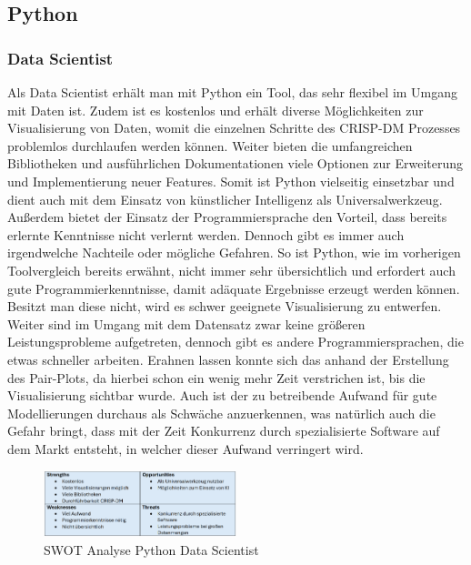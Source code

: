 \documentclass[12pt]{article}
\begin{document}
	\subsection{Python}
	
	\subsubsection{Data Scientist}
	
	Als Data Scientist erhält man mit Python ein Tool, das sehr flexibel im Umgang mit Daten
	ist. Zudem ist es kostenlos und erhält diverse Möglichkeiten zur Visualisierung von
	Daten, womit die einzelnen Schritte des CRISP-DM Prozesses problemlos durchlaufen
	werden können.
	Weiter bieten die umfangreichen Bibliotheken und ausführlichen Dokumentationen
	viele Optionen zur Erweiterung und Implementierung neuer Features. Somit ist Python
	vielseitig einsetzbar und dient auch mit dem Einsatz von künstlicher Intelligenz als
	Universalwerkzeug.
	Außerdem bietet der Einsatz der Programmiersprache den Vorteil, dass bereits erlernte
	Kenntnisse nicht verlernt werden.
	Dennoch gibt es immer auch irgendwelche Nachteile oder mögliche Gefahren.
	So ist Python, wie im vorherigen Toolvergleich bereits erwähnt, nicht immer sehr
	übersichtlich und erfordert auch gute Programmierkenntnisse, damit adäquate
	Ergebnisse erzeugt werden können. Besitzt man diese nicht, wird es schwer geeignete
	Visualisierung zu entwerfen.
	Weiter sind im Umgang mit dem Datensatz zwar keine größeren Leistungsprobleme
	aufgetreten, dennoch gibt es andere Programmiersprachen, die etwas schneller
	arbeiten. Erahnen lassen konnte sich das anhand der Erstellung des Pair-Plots, da
	hierbei schon ein wenig mehr Zeit verstrichen ist, bis die Visualisierung sichtbar wurde.
	Auch ist der zu betreibende Aufwand für gute Modellierungen durchaus als Schwäche
	anzuerkennen, was natürlich auch die Gefahr bringt, dass mit der Zeit Konkurrenz durch
	spezialisierte Software auf dem Markt entsteht, in welcher dieser Aufwand verringert wird.
	\begin{figure}[h]
		\centering
		\includegraphics[width=0.5\textwidth]{SWOT1}
		\caption{SWOT Analyse Python Data Scientist}
	\end{figure}
	
\end{document}
